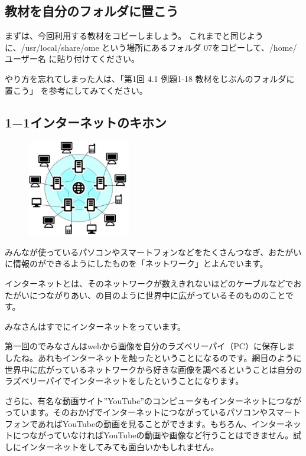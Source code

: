 \documentclass[a4paper,12pt,dvipdfmx]{jarticle}
\newcounter {PagePtr}
\begin{document}
\begin{description}
\end{description}

\clearpage\subsection*{教材を自分のフォルダに置こう}
まずは、今回利用する教材をコピーしましょう。
これまでと同じように、/usr/local/share/ome という場所にあるフォルダ 07をコピーして、/home/ユーザー名 に貼り付けてください。

やり方を忘れてしまった人は、「第1回 4.1 例題1-18 教材をじぶんのフォルダに置こう」 を参考にしてみてください。

\subsection*{1−1インターネットのキホン}
\label{P:internet}
\begin{figure}
	\includegraphics[width=0.4\textwidth]{ome7-img002.eps}
\end{figure}

みんなが使っているパソコンやスマートフォンなどをたくさんつなぎ、おたがいに情報のができるようにしたものを「ネットワーク」とよんでいます。

インターネットとは、そのネットワークが数えきれないほどのケーブルなどでおたがいにつながりあい、の目のように世界中に広がっているそのもののことです。


\bigskip

みなさんはすでにインターネットをっています。

第一回のでみなさんはwebから画像を自分のラズベリーパイ（PC）に保存しましたね。あれもインターネットを触ったということになるのです。網目のように世界中に広がっているネットワークから好きな画像を調べるということは自分のラズベリーパイでインターネットをしたということになります。

さらに、有名な動画サイト”YouTube”のコンピュータもインターネットにつながっています。そのおかげでインターネットにつながっているパソコンやスマートフォンであればYouTubeの動画を見ることができます。もちろん、インターネットにつながっていなければYouTubeの動画や画像など行うことはできません。試しにインターネットをしてみても面白いかもしれません。
\end{document}
